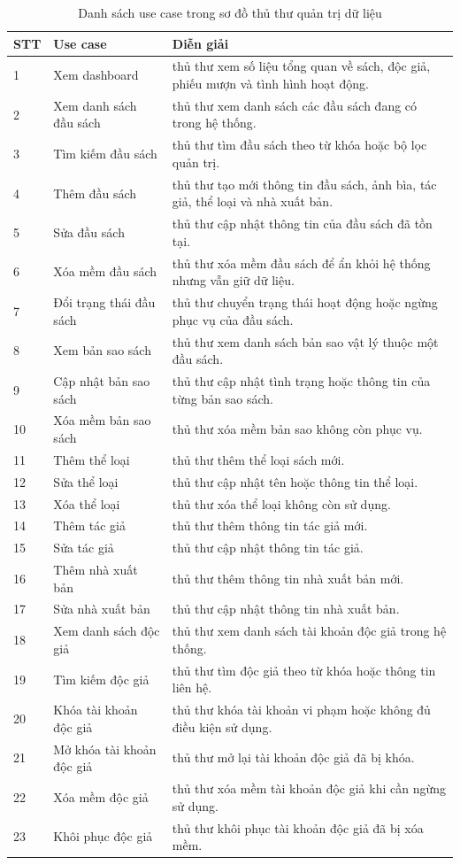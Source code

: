 \documentclass[../main.tex]{subfiles}
\begin{document}
\begin{longtable}{|p{1cm}|p{4cm}|p{8cm}|}
\caption{Danh sách use case trong sơ đồ thủ thư quản trị dữ liệu}\\
\hline
\textbf{STT} & \textbf{Use case} & \textbf{Diễn giải} \\
\hline
1 & Xem dashboard & thủ thư xem số liệu tổng quan về sách, độc giả, phiếu mượn và tình hình hoạt động. \\
\hline
2 & Xem danh sách đầu sách & thủ thư xem danh sách các đầu sách đang có trong hệ thống. \\
\hline
3 & Tìm kiếm đầu sách & thủ thư tìm đầu sách theo từ khóa hoặc bộ lọc quản trị. \\
\hline
4 & Thêm đầu sách & thủ thư tạo mới thông tin đầu sách, ảnh bìa, tác giả, thể loại và nhà xuất bản. \\
\hline
5 & Sửa đầu sách & thủ thư cập nhật thông tin của đầu sách đã tồn tại. \\
\hline
6 & Xóa mềm đầu sách & thủ thư xóa mềm đầu sách để ẩn khỏi hệ thống nhưng vẫn giữ dữ liệu. \\
\hline
7 & Đổi trạng thái đầu sách & thủ thư chuyển trạng thái hoạt động hoặc ngừng phục vụ của đầu sách. \\
\hline
8 & Xem bản sao sách & thủ thư xem danh sách bản sao vật lý thuộc một đầu sách. \\
\hline
9 & Cập nhật bản sao sách & thủ thư cập nhật tình trạng hoặc thông tin của từng bản sao sách. \\
\hline
10 & Xóa mềm bản sao sách & thủ thư xóa mềm bản sao không còn phục vụ. \\
\hline
11 & Thêm thể loại & thủ thư thêm thể loại sách mới. \\
\hline
12 & Sửa thể loại & thủ thư cập nhật tên hoặc thông tin thể loại. \\
\hline
13 & Xóa thể loại & thủ thư xóa thể loại không còn sử dụng. \\
\hline
14 & Thêm tác giả & thủ thư thêm thông tin tác giả mới. \\
\hline
15 & Sửa tác giả & thủ thư cập nhật thông tin tác giả. \\
\hline
16 & Thêm nhà xuất bản & thủ thư thêm thông tin nhà xuất bản mới. \\
\hline
17 & Sửa nhà xuất bản & thủ thư cập nhật thông tin nhà xuất bản. \\
\hline
18 & Xem danh sách độc giả & thủ thư xem danh sách tài khoản độc giả trong hệ thống. \\
\hline
19 & Tìm kiếm độc giả & thủ thư tìm độc giả theo từ khóa hoặc thông tin liên hệ. \\
\hline
20 & Khóa tài khoản độc giả & thủ thư khóa tài khoản vi phạm hoặc không đủ điều kiện sử dụng. \\
\hline
21 & Mở khóa tài khoản độc giả & thủ thư mở lại tài khoản độc giả đã bị khóa. \\
\hline
22 & Xóa mềm độc giả & thủ thư xóa mềm tài khoản độc giả khi cần ngừng sử dụng. \\
\hline
23 & Khôi phục độc giả & thủ thư khôi phục tài khoản độc giả đã bị xóa mềm. \\
\hline
\end{longtable}
\end{document}
